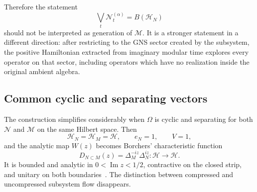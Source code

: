\documentclass[a4paper,11pt]{article}
\theoremstyle{definition}
\begin{document}
Therefore the statement
\begin{equation}
    \bigvee_t\mathcal N_t^{(\alpha)}
    =
    B(\mathcal H_N)
\end{equation}
should not be interpreted as generation of $\mathcal M$. It is a stronger
statement in a different direction: after restricting to the GNS sector
created by the subsystem, the positive Hamiltonian extracted from imaginary
modular time explores every operator on that sector, including operators
which have no realization inside the original ambient algebra.

\subsection{Common cyclic and separating vectors}
\label{subsec:probing-common-cyclic}

The construction simplifies considerably when $\Omega$ is cyclic and
separating for both $\mathcal N$ and $\mathcal M$ on the same Hilbert space.
Then
\begin{equation}
    \mathcal H_N=\mathcal H_M=\mathcal H,
    \qquad
    e_N=1,
    \qquad
    V=1,
\end{equation}
and the analytic map $W(z)$ becomes Borchers' characteristic function
\begin{equation}
    \boxed{
    D_{N\subset M}(z)
    =
    \Delta_M^{-iz}\Delta_N^{iz}
    :
    \mathcal H\to\mathcal H .
    }
    \label{eq:D-common-probing}
\end{equation}
It is bounded and analytic in
$0<\operatorname{Im}z<1/2$, contractive on the closed strip, and unitary on
both boundaries~\cite{revolutionizing}. The distinction between compressed
and uncompressed subsystem flow disappears.
\end{document}
